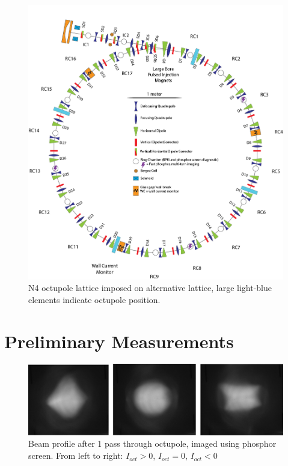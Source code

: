 \begin{figure}[]
   \centering
   \includegraphics[width=\textwidth]{umer-diagram/altlat_N4octu_full_ring_labels.png}
   \caption{N4 octupole lattice imposed on alternative lattice, large light-blue elements indicate octupole position.}
   \label{fig:N4lattice}
\end{figure}



\section{Preliminary Measurements}

\begin{figure}[]
   \centering
    \includegraphics[width=\textwidth]{8.figures/oct_profile.png}
 	\caption{Beam profile after 1 pass through octupole, imaged using phosphor screen. From left to right: $I_{oct} >0$, $I_{oct} =0$, $I_{oct} <0$}
   \label{fig:beam-pass-through-octu}
\end{figure}



